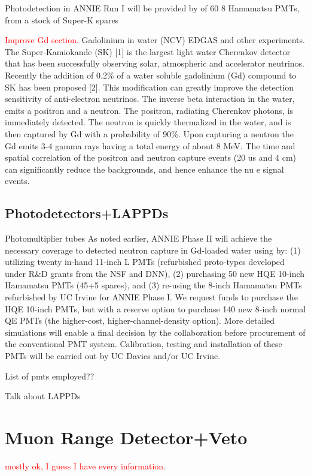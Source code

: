 Photodetection in ANNIE Run I will be provided by of 60 8 Hamamatsu PMTs, from a stock of %
Super-K spares

\textcolor{red}{Improve Gd section.}
Gadolinium in water (NCV)
EDGAS and other experiments.
The Super-Kamiokande (SK) [1] is the largest light water Cherenkov detector %
that has been successfully observing solar, atmospheric and accelerator neutrinos.
Recently the addition of 0.2\% of a water soluble gadolinium (Gd) compound to SK %
has been proposed [2].
This modification can greatly improve the detection sensitivity of anti-electron neutrinos.
The inverse beta interaction in the water, emits a positron and a neutron.
The positron, radiating Cherenkov photons, is immediately detected.
The neutron is quickly thermalized in the water, and is then captured by Gd with a %
probability of 90\%.
Upon capturing a neutron the Gd emits 3-4 gamma rays having a total energy of %
about 8 MeV.
The time and spatial correlation of the positron and neutron capture events (20 us and 4 cm) %
can significantly reduce the backgrounds, and hence enhance the nu e signal events.

\subsection{Photodetectors+LAPPDs}
\label{2.2.1}
Photomultiplier tubes
As noted earlier, ANNIE Phase II will achieve the necessary coverage to detected neutron capture
in Gd-loaded water using by: (1) utilizing twenty in-hand 11-inch L PMTs (refurbished %
proto-types developed under R\&D grants from the NSF and DNN), (2) purchasing 50 new HQE 10-inch %
Hamamatsu PMTs (45+5 spares), and (3) re-using the 8-inch Hamamatsu PMTs refurbished by %
UC Irvine for ANNIE Phase I.
We request funds to purchase the HQE 10-inch PMTs, but with a reserve option to purchase %
140 new 8-inch normal QE PMTs (the higher-cost, higher-channel-density option).
More detailed simulations will enable a final decision by the collaboration before %
procurement of the conventional PMT system.
Calibration, testing and installation of these PMTs will be carried out by UC Davies and/or UC Irvine.

List of pmts employed??

Talk about LAPPDs

\section[MRD and VETO]{Muon Range Detector+Veto}
\label{2.3}
\textcolor{red}{mostly ok, I guess I have every information.}

